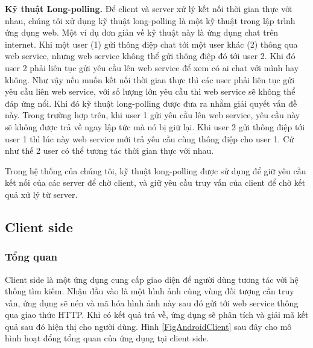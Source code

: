 \textbf{Kỹ thuật Long-polling.} Để client và server xử lý kết nối thời gian thực với nhau, chúng tôi xử dụng kỹ thuật long-polling là một kỹ thuật trong lập trình ứng dụng web. Một ví dụ đơn giản về kỹ thuật này là ứng dụng chat trên internet. Khi một user (1) gửi thông điệp chat tới một user khác (2) thông qua web service, nhưng web service không thể gửi thông điệp đó tới user 2. Khi đó user 2 phải liên tục gửi yêu cầu lên web service để xem có ai chat với mình hay không. Như vậy nếu muốn kết nối thời gian thực thì các user phải liên tục gửi yêu cầu liên web service, với số lượng lớn yêu cầu thì web service sẽ không thể đáp ứng nổi. Khi đó kỹ thuật long-polling được đưa ra nhằm giải quyết vấn đề này. Trong trường hợp trên, khi user 1 gửi yêu cầu lên web service, yêu cầu này sẽ không được trả về ngay lập tức mà nó bị giữ lại. Khi user 2 gửi thông điệp tới user 1 thì lúc này web service mới trả yêu cầu cùng thông điệp cho user 1. Cứ như thế 2 user có thể tương tác thời gian thực với nhau.

Trong hệ thống của chúng tôi, kỹ thuật long-polling được sử dụng để giữ yêu cầu kết nối của các server để chờ client, và giữ yêu cầu truy vấn của client để chờ kết quả xử lý từ server.

\subsection{Client side}
\subsubsection{Tổng quan}
Client side là một ứng dụng cung cấp giao diện để người dùng tương tác với hệ thống tìm kiếm. Nhận đầu vào là một hình ảnh cùng vùng đối tượng cần truy vấn, ứng dụng sẽ nén và mã hóa hình ảnh này sau đó gửi tới web service thông qua giao thức HTTP. Khi có kết quả trả về, ứng dụng sẽ phân tích và giải mã kết quả sau đó hiện thị cho người dùng. Hình \ref{FigAndroidClient} sau đây cho mô hình hoạt đổng tổng quan của ứng dụng tại client side.


